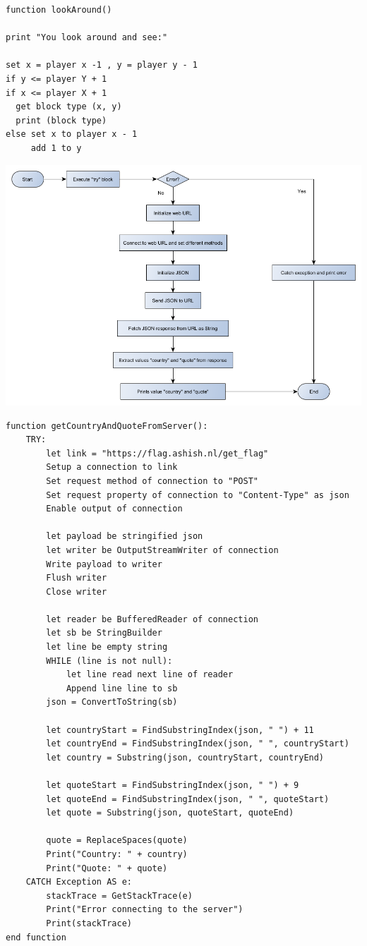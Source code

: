 \begin{lstlisting}
function lookAround()

print "You look around and see:"

set x = player x -1 , y = player y - 1
if y <= player Y + 1 
if x <= player X + 1
  get block type (x, y)
  print (block type)
else set x to player x - 1
     add 1 to y

\end{lstlisting}
\newpage

{\includegraphics[width=\textwidth]{../flowchart/getCountryAndQuoteFromServer.png}}

\begin{lstlisting}
function getCountryAndQuoteFromServer():
    TRY:
        let link = "https://flag.ashish.nl/get_flag"
        Setup a connection to link
        Set request method of connection to "POST"
        Set request property of connection to "Content-Type" as json
        Enable output of connection

        let payload be stringified json
        let writer be OutputStreamWriter of connection
        Write payload to writer
        Flush writer
        Close writer
        
        let reader be BufferedReader of connection
        let sb be StringBuilder
        let line be empty string
        WHILE (line is not null):
            let line read next line of reader
            Append line line to sb
        json = ConvertToString(sb)
        
        let countryStart = FindSubstringIndex(json, " ") + 11
        let countryEnd = FindSubstringIndex(json, " ", countryStart)
        let country = Substring(json, countryStart, countryEnd)
        
        let quoteStart = FindSubstringIndex(json, " ") + 9
        let quoteEnd = FindSubstringIndex(json, " ", quoteStart)
        let quote = Substring(json, quoteStart, quoteEnd)
        
        quote = ReplaceSpaces(quote)
        Print("Country: " + country)
        Print("Quote: " + quote)
    CATCH Exception AS e:
        stackTrace = GetStackTrace(e)
        Print("Error connecting to the server")
        Print(stackTrace)
end function
\end{lstlisting}
